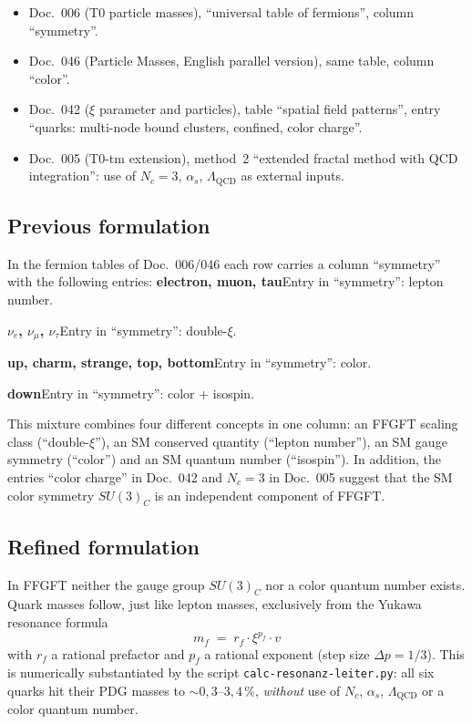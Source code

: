 \begin{itemize}
  \item Doc.~006 (T0 particle masses), \enquote{universal table of fermions},
        column \enquote{symmetry}.
  \item Doc.~046 (Particle Masses, English parallel version), same table,
        column \enquote{color}.
  \item Doc.~042 ($\xi$ parameter and particles), table
        \enquote{spatial field patterns}, entry
        \enquote{quarks: multi-node bound clusters, confined, color charge}.
  \item Doc.~005 (T0-tm extension), method~2 \enquote{extended fractal method
        with QCD integration}: use of $N_c = 3$, $\alpha_s$,
        $\Lambda_{\text{QCD}}$ as external inputs.
\end{itemize}

\subsection*{Previous formulation}

In the fermion tables of Doc.~006/046 each row carries a column
\enquote{symmetry} with the following entries:
\smallskip\noindent \textbf{electron, muon, tau}\quad Entry in \enquote{symmetry}: lepton number.

\smallskip\noindent \textbf{$\nu_e$, $\nu_\mu$, $\nu_\tau$}\quad Entry in \enquote{symmetry}: double-$\xi$.

\smallskip\noindent \textbf{up, charm, strange, top, bottom}\quad Entry in \enquote{symmetry}: color.

\smallskip\noindent \textbf{down}\quad Entry in \enquote{symmetry}: color + isospin.

\medskip


This mixture combines four different concepts in one column: an FFGFT scaling
class (\enquote{double-$\xi$}), an SM conserved quantity (\enquote{lepton
number}), an SM gauge symmetry (\enquote{color}) and an SM quantum number
(\enquote{isospin}). In addition, the entries \enquote{color charge} in
Doc.~042 and $N_c = 3$ in Doc.~005 suggest that the SM color symmetry
$SU(3)_C$ is an independent component of FFGFT.

\subsection*{Refined formulation}

In FFGFT neither the gauge group $SU(3)_C$ nor a color quantum number exists.
Quark masses follow, just like lepton masses, exclusively from the Yukawa
resonance formula
\begin{equation}
  m_f \;=\; r_f \cdot \xi^{p_f} \cdot v
  \tag{190.13}
\end{equation}
with $r_f$ a rational prefactor and $p_f$ a rational exponent (step size
$\Delta p = 1/3$). This is numerically substantiated by the script
\texttt{calc-resonanz-leiter.py}: all six quarks hit their PDG masses to
$\sim 0{,}3\text{--}3{,}4\,\%$, \emph{without} use of $N_c$, $\alpha_s$,
$\Lambda_{\text{QCD}}$ or a color quantum number.

